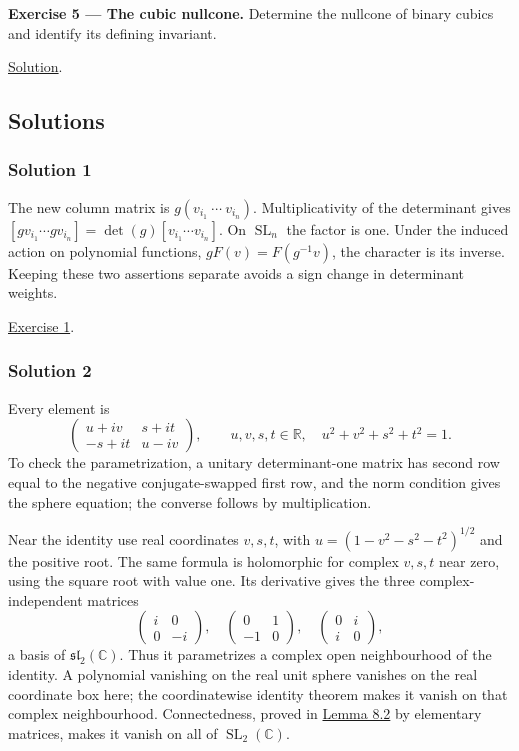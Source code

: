 \documentclass[
]{article}
\begin{document}
\textbf{Exercise 5 --- The cubic nullcone.} Determine the nullcone of
binary cubics and identify its defining invariant.

\hyperref[solution-5]{Solution}.

\subsection{Solutions}\label{solutions}

\subsubsection{Solution 1}\label{solution-1}

The new column matrix is \(g(v_{i_1}\ \cdots\ v_{i_n})\).
Multiplicativity of the determinant gives
\([gv_{i_1}\cdots gv_{i_n}]=\det(g)[v_{i_1}\cdots v_{i_n}]\). On
\(\operatorname{SL}_n\) the factor is one. Under the induced action on
polynomial functions, \(gF(v)=F(g^{-1}v)\), the character is its
inverse. Keeping these two assertions separate avoids a sign change in
determinant weights.

\hyperref[exercise-1]{Exercise 1}.

\subsubsection{Solution 2}\label{solution-2}

Every element is \[
\begin{pmatrix}
u+iv&s+it\\-s+it&u-iv
\end{pmatrix},
\qquad u,v,s,t\in\mathbb R,\quad u^2+v^2+s^2+t^2=1.
\] To check the parametrization, a unitary determinant-one matrix has
second row equal to the negative conjugate-swapped first row, and the
norm condition gives the sphere equation; the converse follows by
multiplication.

Near the identity use real coordinates \(v,s,t\), with
\(u=(1-v^2-s^2-t^2)^{1/2}\) and the positive root. The same formula is
holomorphic for complex \(v,s,t\) near zero, using the square root with
value one. Its derivative gives the three complex-independent matrices
\[
\begin{pmatrix}i&0\\0&-i\end{pmatrix},\quad
\begin{pmatrix}0&1\\-1&0\end{pmatrix},\quad
\begin{pmatrix}0&i\\i&0\end{pmatrix},
\] a basis of \(\mathfrak{sl}_2(\mathbb C)\). Thus it parametrizes a
complex open neighbourhood of the identity. A polynomial vanishing on
the real unit sphere vanishes on the real coordinate box here; the
coordinatewise identity theorem makes it vanish on that complex
neighbourhood. Connectedness, proved in
\href{NOE-INV-01.html\#lemma-8-2}{Lemma 8.2} by elementary matrices,
makes it vanish on all of \(\operatorname{SL}_2(\mathbb C)\).
\end{document}
